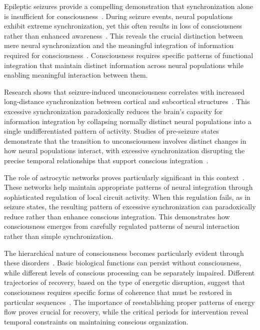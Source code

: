 
Epileptic seizures provide a compelling demonstration that synchronization alone is insufficient for consciousness~\cite{pinotsis2023cytoelectric, amil2024theta}. During seizure events, neural populations exhibit extreme synchronization, yet this often results in loss of consciousness rather than enhanced awareness~\cite{Bartolomei2009}. This reveals the crucial distinction between mere neural synchronization and the meaningful integration of information required for consciousness~\cite{da2024mathematical}. Consciousness requires specific patterns of functional integration that maintain distinct information across neural populations while enabling meaningful interaction between them.

Research shows that seizure-induced unconsciousness correlates with increased long-distance synchronization between cortical and subcortical structures~\cite{Bartolomei2009}. This excessive synchronization paradoxically reduces the brain's capacity for information integration by collapsing normally distinct neural populations into a single undifferentiated pattern of activity. Studies of pre-seizure states demonstrate that the transition to unconsciousness involves distinct changes in how neural populations interact, with excessive synchronization disrupting the precise temporal relationships that support conscious integration~\cite{LeVanQuyen2002}.

The role of astrocytic networks proves particularly significant in this context~\cite{kukushkin2024massed}. These networks help maintain appropriate patterns of neural integration through sophisticated regulation of local circuit activity. When this regulation fails, as in seizure states, the resulting pattern of excessive synchronization can paradoxically reduce rather than enhance conscious integration. This demonstrates how consciousness emerges from carefully regulated patterns of neural interaction rather than simple synchronization.


The hierarchical nature of consciousness becomes particularly evident through these disorders~\cite{butlin2023consciousnessartificialintelligenceinsights}. Basic biological functions can persist without consciousness, while different levels of conscious processing can be separately impaired. Different trajectories of recovery, based on the type of energetic disruption, suggest that consciousness requires specific forms of coherence that must be restored in particular sequences~\cite{pinotsis2023vivo}. The importance of reestablishing proper patterns of energy flow proves crucial for recovery, while the critical periods for intervention reveal temporal constraints on maintaining conscious organization.

